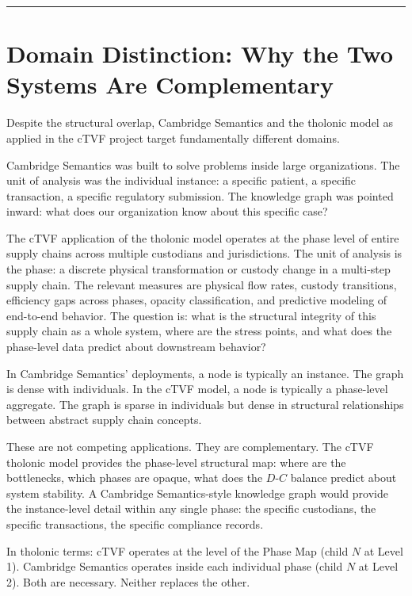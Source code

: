 \documentclass[12pt]{article}
\begin{document}
\begin{center}\rule{0.5\linewidth}{0.5pt}\end{center}

\section{Domain Distinction: Why the Two Systems Are Complementary}\label{domain-distinction-why-the-two-systems-are-complementary}

Despite the structural overlap, Cambridge Semantics and the tholonic
model as applied in the cTVF project target fundamentally different
domains.

Cambridge Semantics was built to solve problems inside large
organizations. The unit of analysis was the individual instance: a
specific patient, a specific transaction, a specific regulatory
submission. The knowledge graph was pointed inward: what does our
organization know about this specific case?

The cTVF application of the tholonic model operates at the phase level
of entire supply chains across multiple custodians and jurisdictions.
The unit of analysis is the phase: a discrete physical transformation or
custody change in a multi-step supply chain. The relevant measures are
physical flow rates, custody transitions, efficiency gaps across phases,
opacity classification, and predictive modeling of end-to-end behavior.
The question is: what is the structural integrity of this supply chain
as a whole system, where are the stress points, and what does the
phase-level data predict about downstream behavior?

In Cambridge Semantics' deployments, a node is typically an instance.
The graph is dense with individuals. In the cTVF model, a node is
typically a phase-level aggregate. The graph is sparse in individuals
but dense in structural relationships between abstract supply chain
concepts.

These are not competing applications. They are complementary. The cTVF
tholonic model provides the phase-level structural map: where are the
bottlenecks, which phases are opaque, what does the \(D\)-\(C\) balance
predict about system stability. A Cambridge Semantics-style knowledge
graph would provide the instance-level detail within any single phase:
the specific custodians, the specific transactions, the specific
compliance records.

In tholonic terms: cTVF operates at the level of the Phase Map (child
\(N\) at Level 1). Cambridge Semantics operates inside each individual
phase (child \(N\) at Level 2). Both are necessary. Neither replaces the
other.
\end{document}
